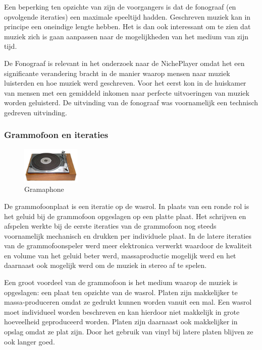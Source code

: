 Een beperking ten opzichte van zijn de voorgangers is dat de fonograaf (en opvolgende iteraties) een maximale speeltijd hadden. Geschreven muziek kan in principe een oneindige lengte hebben. Het is dan ook interessant om te zien dat muziek zich is gaan aanpassen naar de mogelijkheden van het medium van zijn tijd.

De Fonograaf is relevant in het onderzoek naar de NichePlayer omdat het een significante verandering bracht in de manier waarop mensen naar muziek luisterden en hoe muziek werd geschreven. Voor het eerst kon in de huiskamer van mensen met een gemiddeld inkomen naar perfecte uitvoeringen van muziek worden geluisterd. De uitvinding van de fonograaf was voornamelijk een technisch gedreven uitvinding.


\subsubsection*{Grammofoon en iteraties}
\begin{figure}
    \centering
    \includegraphics[width=0.25\textwidth]{assets/critical-review/Gramaphone.jpeg}
    \caption{Gramaphone}
    \label{fig:critical-review:Gramaphone}
\end{figure}
De grammofoonplaat is een iteratie op de wasrol. In plaats van een ronde rol is het geluid bij de grammofoon opgeslagen op een platte plaat. Het schrijven en afspelen werkte bij de eerste iteraties van de grammofoon nog steeds voornamelijk mechanisch en drukken per individuele plaat. In de latere iteraties van de grammofoonspeler werd meer elektronica verwerkt waardoor de kwaliteit en volume van het geluid beter werd, massaproductie mogelijk werd en het daarnaast ook mogelijk werd om de muziek in stereo af te spelen.

Een groot voordeel van de grammofoon is het medium waarop de muziek is opgeslagen: een plaat ten opzichte van de wasrol. Platen zijn makkelijker te massa-produceren omdat ze gedrukt kunnen worden vanuit een mal. Een wasrol moet individueel worden beschreven en kan hierdoor niet makkelijk in grote hoeveelheid geproduceerd worden. Platen zijn daarnaast ook makkelijker in opslag omdat ze plat zijn. Door het gebruik van vinyl bij latere platen blijven ze ook langer goed.

